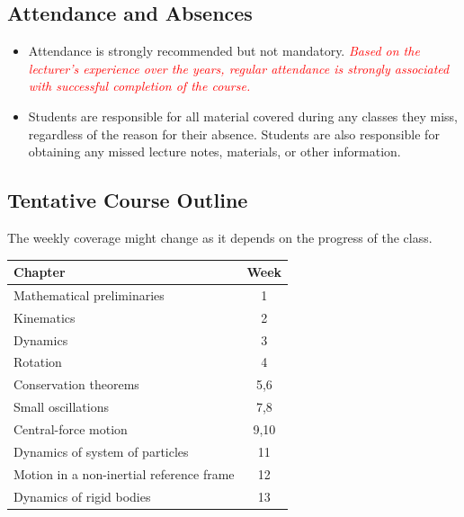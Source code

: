 \documentclass[11pt]{article}
\begin{document}
\subsection*{Attendance and Absences}

\begin{itemize}
\item Attendance is strongly recommended but not mandatory. \textcolor{red}{\emph{Based on the lecturer's experience over the years, regular attendance is strongly associated with successful completion of the course.}}

\item Students are responsible for all material covered during any classes they miss, regardless of the reason for their absence. Students are also responsible for obtaining any missed lecture notes, materials, or other information.
\end{itemize}


\subsection*{Tentative Course Outline}
The weekly coverage might change as it depends on the progress of the class. 

\begin{table}[h!]
	\centering
	\begin{tabular}{ | l | c | }
	\hline
	\textbf{Chapter} & \textbf{Week} \\
	\hline
	Mathematical preliminaries & 1 \\
	\hline
	Kinematics & 2 \\
	\hline
	Dynamics & 3 \\
	\hline
	Rotation & 4 \\
	\hline
	Conservation theorems & 5,6 \\
	\hline
	Small oscillations & 7,8 \\
	\hline
	Central-force motion & 9,10 \\
	\hline
	Dynamics of system of particles & 11 \\
	\hline
	Motion in a non-inertial reference frame & 12 \\
	\hline
	Dynamics of rigid bodies & 13 \\
	\hline
\end{tabular} 
\end{table}


\newpage 
\end{document}
